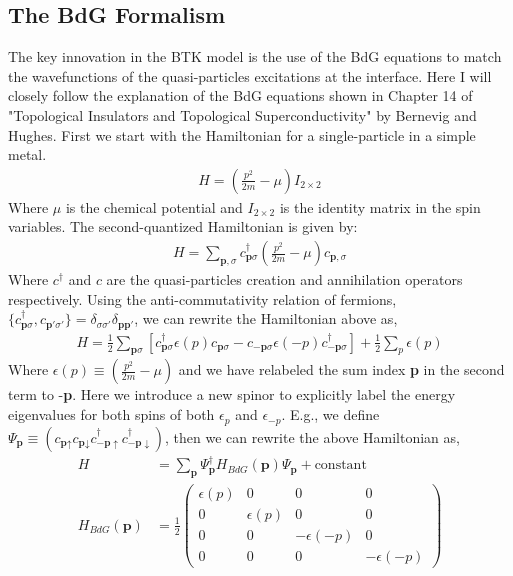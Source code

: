 \subsection{The \ac{BdG} Formalism}
The key innovation in the \ac{BTK} model is the use of the \ac{BdG} equations to match the wavefunctions of the quasi-particles excitations at the interface\cite{BTK}. Here I will closely follow the explanation of the \ac{BdG} equations shown in Chapter 14 of "Topological Insulators and Topological Superconductivity" by Bernevig and Hughes\cite{bernevig_hughes_2013}. First we start with the Hamiltonian for a single-particle in a simple metal.
\begin{align}
    H = \left(\frac{p^{2}}{2m}-\mu\right)I_{2\times2}
\end{align}
Where $\mu$ is the chemical potential and $I_{2\times2}$ is the identity matrix in the spin variables. The second-quantized Hamiltonian is given by:
\begin{align}
    H = \sum_{\textbf{p},\sigma}c_{\textbf{p}\sigma}^{\dagger}\left(\frac{p^{2}}{2m}-\mu\right)c_{\textbf{p},\sigma}
\end{align}
Where $c^{\dagger}$ and $c$ are the quasi-particles creation and annihilation operators respectively. Using the anti-commutativity relation of fermions, $\{c_{\textbf{p}\sigma}^{\dagger},c_{\textbf{p}'\sigma'}\}=\delta_{\sigma\sigma'}\delta_{\textbf{p}\textbf{p}'}$, we can rewrite the Hamiltonian above as,
\begin{align}
    H = \frac{1}{2}\sum_{\textbf{p}\sigma}\left[c_{\textbf{p}\sigma}^{\dagger}\epsilon(p)c_{\textbf{p}\sigma}-c_{-\textbf{p}\sigma}\epsilon(-p)c_{-\textbf{p}\sigma}^{\dagger}\right]+\frac{1}{2}\sum_{p}\epsilon(p)
\end{align}
Where $\epsilon(p)\equiv\left(\frac{p^{2}}{2m}-\mu\right)$ and we have relabeled the sum index \textbf{p} in the second term to -\textbf{p}. Here we introduce a new spinor to explicitly label the energy eigenvalues for both spins of both $\epsilon_{p}$ and $\epsilon_{-p}$. E.g., we define $\Psi_{\textbf{p}}\equiv\left(c_{\textbf{p}\uparrow} c_{\textbf{p}\downarrow} c_{-\textbf{p}\uparrow}^{\dagger}c_{-\textbf{p}\downarrow}^{\dagger}\right)$, then we can rewrite the above Hamiltonian as,
\begin{align}
    H &= \sum_{\textbf{p}}\Psi_{\textbf{p}}^{\dagger}H_{BdG}(\textbf{p})\Psi_{\textbf{p}}+\text{constant}\\
    H_{BdG}(\textbf{p}) &= \frac{1}{2}
    \begin{pmatrix}
    \epsilon(p) & 0 & 0 & 0\\
    0 & \epsilon(p) & 0 & 0\\
    0 & 0 & -\epsilon(-p) & 0\\
    0 & 0 & 0 & -\epsilon(-p)
    \end{pmatrix}
\end{align}
